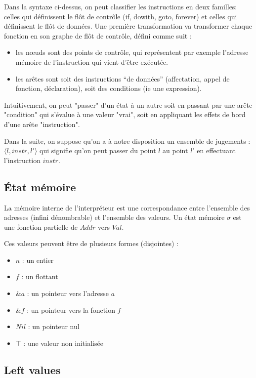 \documentclass{article}
\begin{document}
Dans la syntaxe ci-dessus, on peut classifier les instructions en deux familles:
celles qui définissent le flôt de contrôle (if, dowith, goto, forever) et celles
qui définissent le flôt de données. Une première transformation va transformer
chaque fonction en son graphe de flôt de contrôle, défini comme suit :

\begin{itemize}
\item
  les nœuds sont des points de contrôle, qui représentent par exemple
  l'adresse mémoire de l'instruction qui vient d'être exécutée.
\item
  les arêtes sont soit des instructions ``de données'' (affectation,
  appel de fonction, déclaration), soit des conditions (ie une
  expression).
\end{itemize}

Intuitivement, on peut "passer" d'un état à un autre soit en passant par une
arête "condition" qui s'évalue à une valeur "vrai", soit en appliquant les
effets de bord d'une arête "instruction".

Dans la suite, on suppose qu'on a à notre disposition un ensemble de jugements :
$\langle l, instr, l' \rangle$ qui signifie qu'on peut passer du point $l$ au
point $l'$ en effectuant l'instruction $instr$.

\subsection{État mémoire}

La mémoire interne de l'interpréteur est une correspondance entre l'ensemble des
adresses (infini dénombrable) et l'ensemble des valeurs. Un état mémoire $σ$ est
une fonction partielle de $Addr$ vers $Val$.

Ces valeurs peuvent être de plusieurs formes (disjointes) :

\begin{itemize}
\item $n$ : un entier
\item $f$ : un flottant
\item $\&a$ : un pointeur vers l'adresse $a$
\item $\&f$ : un pointeur vers la fonction $f$
\item $Nil$ : un pointeur nul
\item $\top$ : une valeur non initialisée
\end{itemize}

\subsection{Left values}
\end{document}
